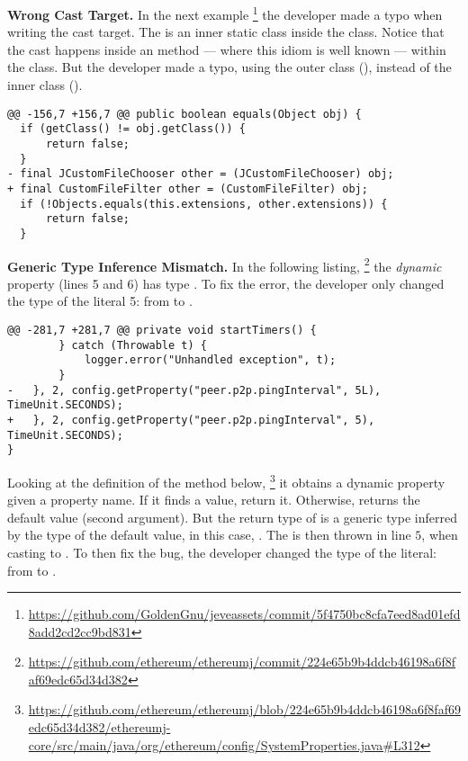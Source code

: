 \textbf{Wrong Cast Target.}
In the next example%
\footnote{\url{https://github.com/GoldenGnu/jeveassets/commit/5f4750bc8cfa7eed8ad01efd8add2cd2cc9bd831}}
the developer made a typo when writing the cast target.
The  is an inner static class inside the  class.
Notice that the cast happens inside an  method
--- where this idiom is well known ---
within the  class.
But the developer made a typo, using the outer class (), instead of the inner class ().

\begin{lstlisting}[style=java]
@@ -156,7 +156,7 @@ public boolean equals(Object obj) {
  if (getClass() != obj.getClass()) {
      return false;
  }
- final JCustomFileChooser other = (JCustomFileChooser) obj;
+ final CustomFileFilter other = (CustomFileFilter) obj;
  if (!Objects.equals(this.extensions, other.extensions)) {
      return false;
  }
\end{lstlisting}

\textbf{Generic Type Inference Mismatch.}
In the following listing,%
\footnote{\url{https://github.com/ethereum/ethereumj/commit/224e65b9b4ddcb46198a6f8faf69edc65d34d382}}
the \emph{dynamic} property  (lines 5 and 6) has type .
To fix the error, the developer only changed the type of the
literal 5: from  to .

\begin{lstlisting}[style=java]
@@ -281,7 +281,7 @@ private void startTimers() {
        } catch (Throwable t) {
            logger.error("Unhandled exception", t);
        }
-   }, 2, config.getProperty("peer.p2p.pingInterval", 5L), TimeUnit.SECONDS);
+   }, 2, config.getProperty("peer.p2p.pingInterval", 5), TimeUnit.SECONDS);
}
\end{lstlisting}

Looking at the definition of the  method below,%
\footnote{\url{https://github.com/ethereum/ethereumj/blob/224e65b9b4ddcb46198a6f8faf69edc65d34d382/ethereumj-core/src/main/java/org/ethereum/config/SystemProperties.java\#L312}}
it obtains a dynamic property given a property name.
If it finds a value, return it.
Otherwise, returns the default value (second argument).
But the return type of  is a generic type inferred
by the type of the default value, in this case, .
The  is then thrown in line $5$,
when casting  to .
To then fix the bug, the developer changed the type of the literal:
from  to .

